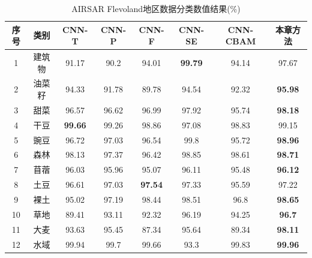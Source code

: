 \begin{table}[ht!]
  \label{tab:fle_res}
  \caption{AIRSAR Flevoland地区数据分类数值结果(\%)}
  \renewcommand\arraystretch{1.0}
  \begin{tabular}{cccccccc}
    \toprule[1.5bp]
    序号                        & 类别    & CNN-T          & CNN-P          & CNN-F          & CNN-SE         & CNN-CBAM       & 本章方法           \\
    \midrule[0.75bp]
    1                         & 建筑物   & 91.17          & 90.2           & 94.01          & \textbf{99.79} & 94.14          & 97.67          \\
    2                         & 油菜籽   & 94.33          & 91.78          & 89.78          & 94.54          & 92.32          & \textbf{95.98} \\
    3                         & 甜菜    & 96.57          & 96.62          & 96.99          & 97.92          & 95.74          & \textbf{98.18} \\
    4                         & 干豆    & \textbf{99.66} & 99.26          & 98.86          & 97.08          & 98.83          & 99.15          \\
    5                         & 豌豆    & 96.72          & 97.03          & 96.54          & 99.8           & 95.72          & \textbf{98.96} \\
    6                         & 森林    & 98.13          & 97.37          & 96.42          & 98.85          & 98.61          & \textbf{98.71} \\
    7                         & 苜蓿    & 96.03          & 95.96          & 95.07          & 96.11          & 95.48          & \textbf{96.12} \\
    8                         & 土豆    & 96.61          & 97.03          & \textbf{97.54} & 97.33          & 95.59          & 97.22          \\
    9                         & 裸土    & 95.02          & 97.19          & 98.44          & 98.51          & 96.8           & \textbf{98.65} \\
    10                        & 草地    & 89.41          & 93.11          & 92.32          & 96.19          & 94.25          & \textbf{96.7}  \\
    11                        & 大麦    & 93.63          & 95.45          & 87.34          & 95.64          & 89.34          & \textbf{98.11} \\
    12                        & 水域    & 99.94          & 99.7           & 99.66          & 93.3           & 99.83          & \textbf{99.96} \\

\end{tabular}
\end{table}
